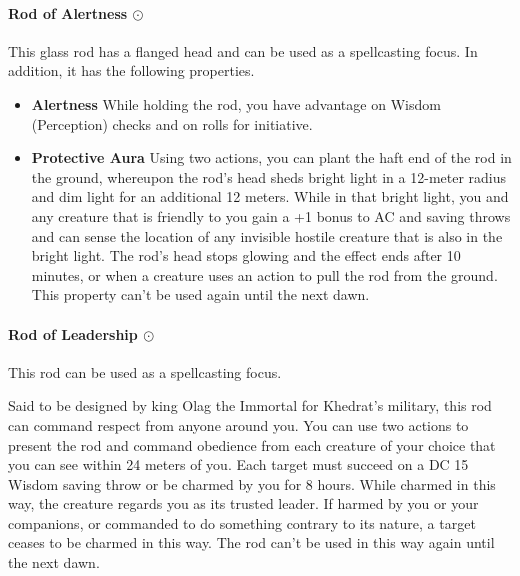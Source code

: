     \paragraph{Rod of Alertness $\odot$}
        This glass rod has a flanged head and can be used as a spellcasting focus.
        In addition, it has the following properties.
        \begin{itemize}
            \item \textbf{Alertness}
            While holding the rod, you have advantage on Wisdom (Perception) checks and on rolls for initiative.
            \item \textbf{Protective Aura}
            Using two actions, you can plant the haft end of the rod in the ground, whereupon the rod's head sheds bright light in a 12-meter radius and dim light for an additional 12 meters.
            While in that bright light, you and any creature that is friendly to you gain a +1 bonus to AC and saving throws and can sense the location of any invisible hostile creature that is also in the bright light.
            The rod's head stops glowing and the effect ends after 10 minutes, or when a creature uses an action to pull the rod from the ground.
            This property can't be used again until the next dawn.
        \end{itemize}
    \paragraph{Rod of Leadership $\odot$}
        This rod can be used as a spellcasting focus.

        Said to be designed by king Olag the Immortal for Khedrat's military, this rod can command respect from anyone around you.
        You can use two actions to present the rod and command obedience from each creature of your choice that you can see within 24 meters of you.
        Each target must succeed on a DC 15 Wisdom saving throw or be charmed by you for 8 hours.
        While charmed in this way, the creature regards you as its trusted leader.
        If harmed by you or your companions, or commanded to do something contrary to its nature, a target ceases to be charmed in this way.
        The rod can't be used in this way again until the next dawn.
